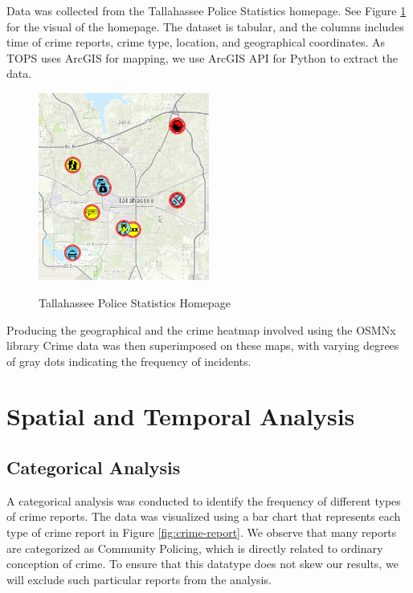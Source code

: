 \documentclass{article}
\begin{document}
Data was collected from the Tallahassee Police Statistics homepage. See Figure \ref{fig:tops} for the visual of the homepage. The dataset is tabular, and the columns includes time of crime reports, crime type, location, and geographical coordinates. As TOPS uses ArcGIS for mapping, we use ArcGIS API for Python to extract the data.

\begin{figure}[!htbp]
    \centering
    \includegraphics[width=0.5\textwidth]{Figures/TOPS.png}
    \label{fig:tops}
    \caption{Tallahassee Police Statistics Homepage}
\end{figure}

Producing the geographical and the crime heatmap involved using the OSMNx library  Crime data was then superimposed on these maps, with varying degrees of gray dots indicating the frequency of incidents.

\section{Spatial and Temporal Analysis}

\subsection{Categorical Analysis}

A categorical analysis was conducted to identify the frequency of different types of crime reports. The data was visualized using a bar chart that represents each type of crime report in Figure \ref{fig:crime-report}. We observe that many reports are categorized as Community Policing, which is directly related to ordinary conception of crime. To ensure that this datatype does not skew our results, we will exclude such particular reports from the analysis.
\end{document}
